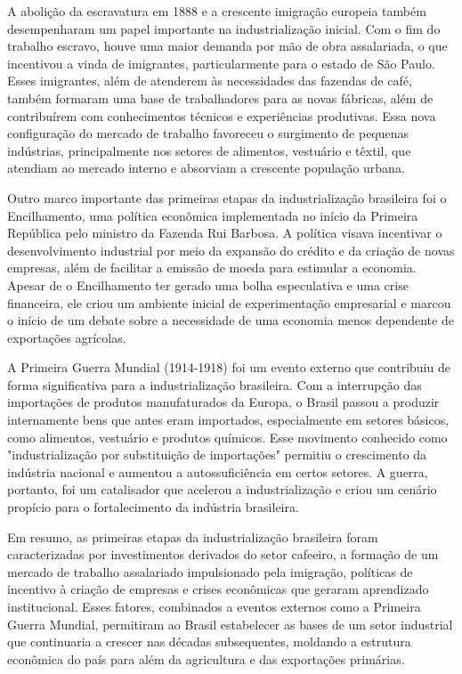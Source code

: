 \documentclass[a4paper,12pt]{article}[abntex2]
\begin{document}
A abolição da escravatura em 1888 e a crescente imigração europeia também desempenharam um papel importante na industrialização inicial. Com o fim do trabalho escravo, houve uma maior demanda por mão de obra assalariada, o que incentivou a vinda de imigrantes, particularmente para o estado de São Paulo. Esses imigrantes, além de atenderem às necessidades das fazendas de café, também formaram uma base de trabalhadores para as novas fábricas, além de contribuírem com conhecimentos técnicos e experiências produtivas. Essa nova configuração do mercado de trabalho favoreceu o surgimento de pequenas indústrias, principalmente nos setores de alimentos, vestuário e têxtil, que atendiam ao mercado interno e absorviam a crescente população urbana.

Outro marco importante das primeiras etapas da industrialização brasileira foi o Encilhamento, uma política econômica implementada no início da Primeira República pelo ministro da Fazenda Rui Barbosa. A política visava incentivar o desenvolvimento industrial por meio da expansão do crédito e da criação de novas empresas, além de facilitar a emissão de moeda para estimular a economia. Apesar de o Encilhamento ter gerado uma bolha especulativa e uma crise financeira, ele criou um ambiente inicial de experimentação empresarial e marcou o início de um debate sobre a necessidade de uma economia menos dependente de exportações agrícolas.

A Primeira Guerra Mundial (1914-1918) foi um evento externo que contribuiu de forma significativa para a industrialização brasileira. Com a interrupção das importações de produtos manufaturados da Europa, o Brasil passou a produzir internamente bens que antes eram importados, especialmente em setores básicos, como alimentos, vestuário e produtos químicos. Esse movimento conhecido como "industrialização por substituição de importações" permitiu o crescimento da indústria nacional e aumentou a autossuficiência em certos setores. A guerra, portanto, foi um catalisador que acelerou a industrialização e criou um cenário propício para o fortalecimento da indústria brasileira.

Em resumo, as primeiras etapas da industrialização brasileira foram caracterizadas por investimentos derivados do setor cafeeiro, a formação de um mercado de trabalho assalariado impulsionado pela imigração, políticas de incentivo à criação de empresas e crises econômicas que geraram aprendizado institucional. Esses fatores, combinados a eventos externos como a Primeira Guerra Mundial, permitiram ao Brasil estabelecer as bases de um setor industrial que continuaria a crescer nas décadas subsequentes, moldando a estrutura econômica do país para além da agricultura e das exportações primárias.
\end{document}
